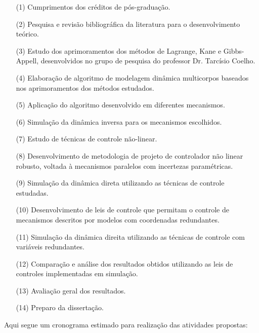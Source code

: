 \documentclass[a4paper,11pt,brazil,fleqn]{article}
\begin{document}
\begin{itemize}
\item[(1)] 	Cumprimentos dos cr\'editos de p\'os-gradua\c{c}\~ao.
\item[(2)] 	Pesquisa e revis\~ao bibliogr\'afica da literatura para o desenvolvimento te\'orico.
\item[(3)] 	Estudo dos aprimoramentos dos m\'etodos de Lagrange, Kane e Gibbs-Appell, desenvolvidos no grupo de pesquisa do professor Dr. Tarc\'isio Coelho.
\item[(4)]  Elabora\c{c}\~ao de algoritmo de modelagem din\^amica multicorpos baseados nos aprimoramentos dos m\'etodos estudados.
\item[(5)] 	Aplica\c{c}\~ao do algoritmo desenvolvido em diferentes mecanismos.
\item[(6)] 	Simula\c{c}\~ao da din\^amica inversa para os mecanismos escolhidos.
\item[(7)]  Estudo de t\'ecnicas de controle n\~ao-linear.
\item[(8)]  Desenvolvimento de metodologia de projeto de controlador n\~ao linear robusto, voltada \`a mecanismos paralelos com incertezas param\'etricas.
\item[(9)] 	Simula\c{c}\~ao da din\^amica direta utilizando as t\'ecnicas de controle estudadas.
\item[(10)] 	Desenvolvimento de leis de controle que permitam  o controle de mecanismos descritos por modelos  com coordenadas redundantes.
\item[(11)] Simula\c{c}\~ao da din\^amica direita utilizando as t\'ecnicas de controle com vari\'aveis redundantes.
\item[(12)] 	Compara\c{c}\~ao e an\'alise dos resultados obtidos utilizando as leis de controles implementadas em simula\c{c}\~ao.
\item[(13)] 	Avalia\c{c}\~ao geral dos resultados.
\item[(14)] Preparo da disserta\c{c}\~ao.
\end{itemize}

Aqui segue um cronograma estimado para realiza\c{c}\~ao das atividades propostas:
\end{document}
